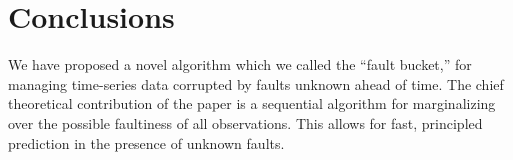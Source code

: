 \documentclass{article}
\begin{document}
\section{Conclusions}
We have proposed a novel algorithm which we called the ``fault
bucket,'' for managing time-series data corrupted by faults unknown
ahead of time. The chief theoretical contribution of the paper is a
sequential algorithm for marginalizing over the possible faultiness of
all observations. This allows for fast, principled prediction in the
presence of unknown faults.



\end{document}
